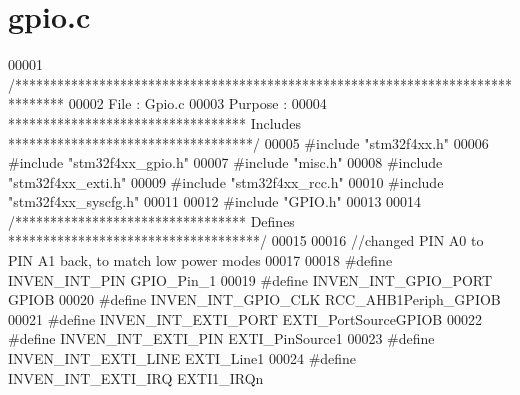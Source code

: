 \section{gpio.\+c}
\label{gpio_8c_source}

\begin{DoxyCode}
00001 \textcolor{comment}{/*******************************************************************************}
00002 \textcolor{comment}{File    : Gpio.c}
00003 \textcolor{comment}{Purpose : }
00004 \textcolor{comment}{********************************** Includes ***********************************/}
00005 \textcolor{preprocessor}{#}\textcolor{preprocessor}{include} "stm32f4xx.h"
00006 \textcolor{preprocessor}{#}\textcolor{preprocessor}{include} "stm32f4xx_gpio.h"
00007 \textcolor{preprocessor}{#}\textcolor{preprocessor}{include} "misc.h"
00008 \textcolor{preprocessor}{#}\textcolor{preprocessor}{include} "stm32f4xx_exti.h"
00009 \textcolor{preprocessor}{#}\textcolor{preprocessor}{include} "stm32f4xx_rcc.h"
00010 \textcolor{preprocessor}{#}\textcolor{preprocessor}{include} "stm32f4xx_syscfg.h"
00011 
00012 \textcolor{preprocessor}{#}\textcolor{preprocessor}{include} \textcolor{preprocessor}{"GPIO.h"}
00013 
00014 \textcolor{comment}{/********************************* Defines ************************************/}
00015 
00016 \textcolor{comment}{//changed PIN A0 to PIN A1 back, to match low power modes }
00017 
00018 \textcolor{preprocessor}{#}\textcolor{preprocessor}{define} \textcolor{preprocessor}{INVEN\_INT\_PIN}                         GPIO_Pin_1
00019 \textcolor{preprocessor}{#}\textcolor{preprocessor}{define} \textcolor{preprocessor}{INVEN\_INT\_GPIO\_PORT}                   GPIOB
00020 \textcolor{preprocessor}{#}\textcolor{preprocessor}{define} \textcolor{preprocessor}{INVEN\_INT\_GPIO\_CLK}                    RCC_AHB1Periph_GPIOB
00021 \textcolor{preprocessor}{#}\textcolor{preprocessor}{define} \textcolor{preprocessor}{INVEN\_INT\_EXTI\_PORT}                   EXTI_PortSourceGPIOB
00022 \textcolor{preprocessor}{#}\textcolor{preprocessor}{define} \textcolor{preprocessor}{INVEN\_INT\_EXTI\_PIN}                    EXTI_PinSource1
00023 \textcolor{preprocessor}{#}\textcolor{preprocessor}{define} \textcolor{preprocessor}{INVEN\_INT\_EXTI\_LINE}                   EXTI_Line1
00024 \textcolor{preprocessor}{#}\textcolor{preprocessor}{define} \textcolor{preprocessor}{INVEN\_INT\_EXTI\_IRQ}                    \textcolor{preprocessor}{EXTI1\_IRQn}

\end{DoxyCode}
